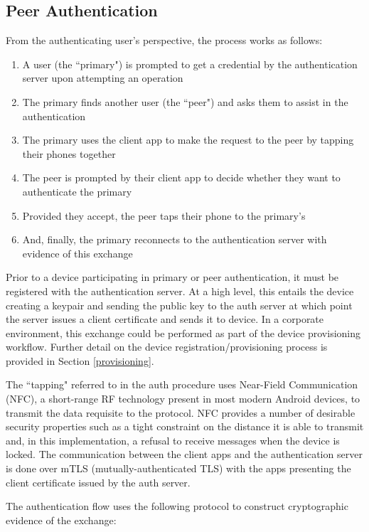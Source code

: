 \documentclass[letterpaper, 10 pt, conference]{ieeeconf}
\begin{document}
  \subsection{Peer Authentication} \label{peerauth}

  From the authenticating user's perspective, the process works as follows:
  \begin{enumerate}
    \item A user (the ``primary") is prompted to get a credential by the authentication server upon attempting an operation
    \item The primary finds another user (the ``peer") and asks them to assist in the authentication
    \item The primary uses the client app to make the request to the peer by tapping their phones together
    \item The peer is prompted by their client app to decide whether they want to authenticate the primary
    \item Provided they accept, the peer taps their phone to the primary's
    \item And, finally, the primary reconnects to the authentication server with evidence of this exchange
  \end{enumerate}

  Prior to a device participating in primary or peer authentication, it must be registered with the authentication server.
  At a high level, this entails the device creating a keypair and sending the public key to the auth server at which point the server issues a client certificate and sends it to device.
  In a corporate environment, this exchange could be performed as part of the device provisioning workflow.
  Further detail on the device registration/provisioning process is provided in Section \ref{provisioning}.

  The ``tapping" referred to in the auth procedure uses Near-Field Communication (NFC), a short-range RF technology present in most modern Android devices, to transmit the data requisite to the protocol.
  NFC provides a number of desirable security properties such as a tight constraint on the distance it is able to transmit and, in this implementation, a refusal to receive messages when the device is locked.
  The communication between the client apps and the authentication server is done over mTLS (mutually-authenticated TLS) with the apps presenting the client certificate issued by the auth server.

  The authentication flow uses the following protocol to construct cryptographic evidence of the exchange:
  
\end{document}
